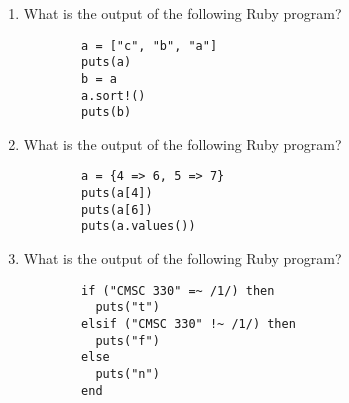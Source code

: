 \documentclass[11pt]{article}
\begin{document}
\begin{enumerate}
\begin{enumerate}
            \item What is the output of the following Ruby program?

                  \begin{Verbatim}
        a = ["c", "b", "a"]
        puts(a)
        b = a
        a.sort!()
        puts(b)
                  \end{Verbatim}

            \item What is the output of the following Ruby program?

                  \begin{Verbatim}
        a = {4 => 6, 5 => 7}
        puts(a[4])
        puts(a[6])
        puts(a.values())
                  \end{Verbatim}



            \item What is the output of the following Ruby program?

                  \begin{Verbatim}
        if ("CMSC 330" =~ /1/) then
          puts("t")
        elsif ("CMSC 330" !~ /1/) then
          puts("f")
        else
          puts("n")
        end
                  \end{Verbatim}




\end{enumerate}
\end{enumerate}
\end{document}
